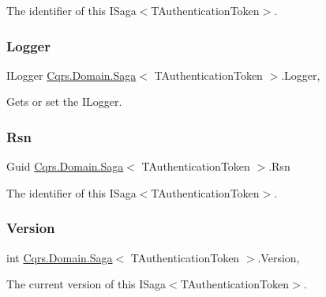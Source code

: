The identifier of this I\+Saga$<$\+T\+Authentication\+Token$>$. 

\mbox{\label{classCqrs_1_1Domain_1_1Saga_aafb1c7c3c83211709322470a8fd150b5_aafb1c7c3c83211709322470a8fd150b5}} 
\subsubsection{\texorpdfstring{Logger}{Logger}}
{\footnotesize\ttfamily I\+Logger \hyperlink{classCqrs_1_1Domain_1_1Saga}{Cqrs.\+Domain.\+Saga}$<$ T\+Authentication\+Token $>$.Logger\hspace{0.3cm}{\ttfamily [get]}, {\ttfamily [protected]}}



Gets or set the I\+Logger. 

\mbox{\label{classCqrs_1_1Domain_1_1Saga_a2a7053e3d31629aa8a25cb38a238aca5_a2a7053e3d31629aa8a25cb38a238aca5}} 
\subsubsection{\texorpdfstring{Rsn}{Rsn}}
{\footnotesize\ttfamily Guid \hyperlink{classCqrs_1_1Domain_1_1Saga}{Cqrs.\+Domain.\+Saga}$<$ T\+Authentication\+Token $>$.Rsn\hspace{0.3cm}{\ttfamily [get]}}



The identifier of this I\+Saga$<$\+T\+Authentication\+Token$>$. 

\mbox{\label{classCqrs_1_1Domain_1_1Saga_a581e88da4e3e76d3704586f97866a7a6_a581e88da4e3e76d3704586f97866a7a6}} 
\subsubsection{\texorpdfstring{Version}{Version}}
{\footnotesize\ttfamily int \hyperlink{classCqrs_1_1Domain_1_1Saga}{Cqrs.\+Domain.\+Saga}$<$ T\+Authentication\+Token $>$.Version\hspace{0.3cm}{\ttfamily [get]}, {}}



The current version of this I\+Saga$<$\+T\+Authentication\+Token$>$. 

